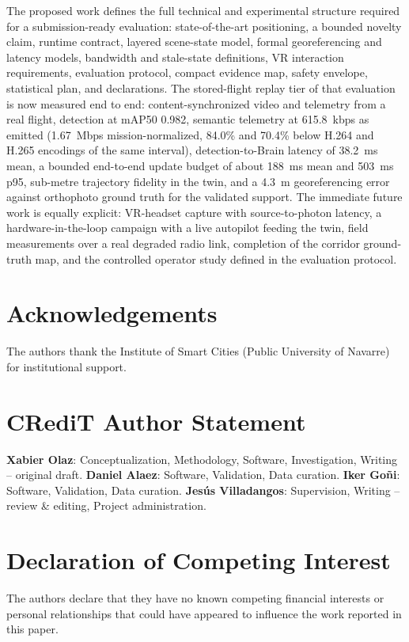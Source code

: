 \documentclass[fleqn]{VRIH2025}
\begin{document}
The proposed work defines the full technical and experimental structure required for a submission-ready evaluation: state-of-the-art positioning, a bounded novelty claim, runtime contract, layered scene-state model, formal georeferencing and latency models, bandwidth and stale-state definitions, VR interaction requirements, evaluation protocol, compact evidence map, safety envelope, statistical plan, and declarations.
The stored-flight replay tier of that evaluation is now measured end to end: content-synchronized video and telemetry from a real flight, detection at mAP50 0.982, semantic telemetry at 615.8~kbps as emitted (1.67~Mbps mission-normalized, 84.0\% and 70.4\% below H.264 and H.265 encodings of the same interval), detection-to-Brain latency of 38.2~ms mean, a bounded end-to-end update budget of about 188~ms mean and 503~ms p95, sub-metre trajectory fidelity in the twin, and a 4.3~m georeferencing error against orthophoto ground truth for the validated support. The immediate future work is equally explicit: VR-headset capture with source-to-photon latency, a hardware-in-the-loop campaign with a live autopilot feeding the twin, field measurements over a real degraded radio link, completion of the corridor ground-truth map, and the controlled operator study defined in the evaluation protocol.

\section*{Acknowledgements}

The authors thank the Institute of Smart Cities (Public University of Navarre) for institutional support.

\section*{CRediT Author Statement}

\textbf{Xabier Olaz}: Conceptualization, Methodology, Software, Investigation, Writing -- original draft. \textbf{Daniel Alaez}: Software, Validation, Data curation. \textbf{Iker Go\~ni}: Software, Validation, Data curation. \textbf{Jes\'us Villadangos}: Supervision, Writing -- review \& editing, Project administration.

\section*{Declaration of Competing Interest}

The authors declare that they have no known competing financial interests or personal relationships that could have appeared to influence the work reported in this paper.
\end{document}
